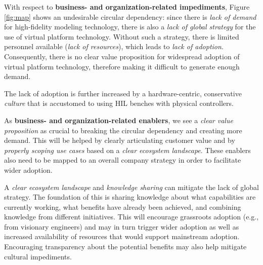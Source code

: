 With respect to \textbf{business- and organization-related impediments}, Figure \ref{fig:map} shows an undesirable circular dependency:
since there is \emph{lack of demand} for high-fidelity modeling technology,
there is also a \emph{lack of global strategy} for the use of virtual platform technology.
Without such a strategy, there is limited personnel available (\emph{lack of resources}),
which leads to \emph{lack of adoption}.
Consequently, there is no clear value proposition for widespread adoption of virtual platform technology, therefore making it difficult to generate enough demand.

The lack of adoption is further increased by a hardware-centric, conservative \emph{culture} that is accustomed to using HIL benches with physical controllers.

As \textbf{business- and organization-related enablers}, %
we see a \emph{clear value proposition} as crucial to breaking the circular dependency and creating more demand.
This will be helped by clearly articulating customer value and by \emph{properly scoping use cases} based on a \emph{clear ecosystem landscape}.
These enablers also need to be mapped to an overall company strategy in order to facilitate wider adoption. 

A \emph{clear ecosystem landscape} and \emph{knowledge sharing} can mitigate the lack of global strategy.
The foundation of this is sharing knowledge about what capabilities are currently working, what benefits have already been achieved, and combining knowledge from different initiatives.
This will encourage grassroots adoption (e.g., from visionary engineers) and may in turn trigger wider adoption
as well as increased availability of resources that would support mainstream adoption. Encouraging transparency about the potential benefits may also help mitigate cultural impediments.

